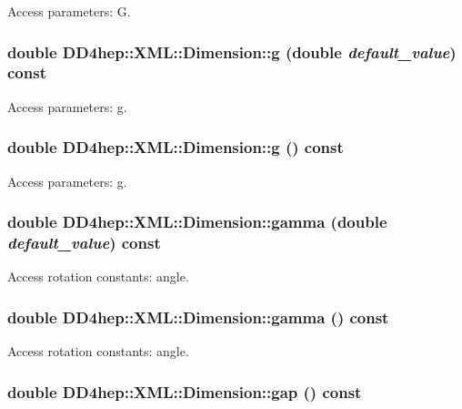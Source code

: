 Access parameters: G. \hypertarget{struct_d_d4hep_1_1_x_m_l_1_1_dimension_a65e4fda444d3e0bff0a49f3e3aabb583}{
\subsubsection[{g}]{\setlength{\rightskip}{0pt plus 5cm}double DD4hep::XML::Dimension::g (double {\em default\_\-value}) const}}
\label{struct_d_d4hep_1_1_x_m_l_1_1_dimension_a65e4fda444d3e0bff0a49f3e3aabb583}


Access parameters: g. \hypertarget{struct_d_d4hep_1_1_x_m_l_1_1_dimension_ac985de89779aec40442a5e742b5ddfa0}{
\subsubsection[{g}]{\setlength{\rightskip}{0pt plus 5cm}double DD4hep::XML::Dimension::g () const}}
\label{struct_d_d4hep_1_1_x_m_l_1_1_dimension_ac985de89779aec40442a5e742b5ddfa0}


Access parameters: g. \hypertarget{struct_d_d4hep_1_1_x_m_l_1_1_dimension_af5bbe468bc9055c3903293337df7aaba}{
\subsubsection[{gamma}]{\setlength{\rightskip}{0pt plus 5cm}double DD4hep::XML::Dimension::gamma (double {\em default\_\-value}) const}}
\label{struct_d_d4hep_1_1_x_m_l_1_1_dimension_af5bbe468bc9055c3903293337df7aaba}


Access rotation constants: angle. \hypertarget{struct_d_d4hep_1_1_x_m_l_1_1_dimension_a585292a92a43f65c8dcd89f5f96706bd}{
\subsubsection[{gamma}]{\setlength{\rightskip}{0pt plus 5cm}double DD4hep::XML::Dimension::gamma () const}}
\label{struct_d_d4hep_1_1_x_m_l_1_1_dimension_a585292a92a43f65c8dcd89f5f96706bd}


Access rotation constants: angle. \hypertarget{struct_d_d4hep_1_1_x_m_l_1_1_dimension_a5eb298d2815783f68d0ee3e1dfa34d0f}{
\subsubsection[{gap}]{\setlength{\rightskip}{0pt plus 5cm}double DD4hep::XML::Dimension::gap () const}}
\label{struct_d_d4hep_1_1_x_m_l_1_1_dimension_a5eb298d2815783f68d0ee3e1dfa34d0f}


